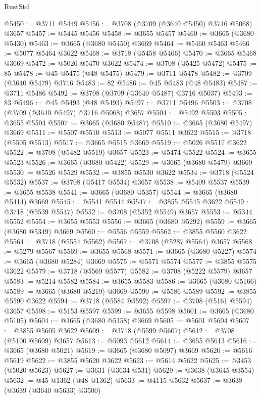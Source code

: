 \begin{lexlean}{RustStd}
\begin{coremodule}
@5450 := @3711 @5449
@5456 := @3708 (@3709 (@3640 @5450) @3716 @5068) @3657
@5457 := @5445 @5456
@5458 := @3655 @5457
@5460 := @3665 (@3680 @5430)
@5463 := @3665 (@3680 @5450) @3669
@5464 := @5460 @5463
@5466 := @5077 @5464 @3622
@5468 := @3718 (@5458 @5466)
@5470 := @3665 @5468 @3669
@5472 := @5026 @5470 @3622
@5474 := @3708 (@5425 @5472)
@5475 := 85
@5478 := @45 @5475 (@48 @5475)
@5479 := @3711 @5478
@5482 := @3709 (@3640 @5479) @3716
@5483 := 82
@5486 := @45 @5483 (@48 @5483)
@5487 := @3711 @5486
@5492 := @3708 (@3709 (@3640 @5487) @3716 @5037)
@5493 := 83
@5496 := @45 @5493 (@48 @5493)
@5497 := @3711 @5496
@5503 := @3708 (@3709 (@3640 @5497) @3716 @5068) @3657
@5504 := @5492 @5503
@5505 := @3655 @5504
@5507 := @3665 (@3680 @5487)
@5510 := @3665 (@3680 @5497) @3669
@5511 := @5507 @5510
@5513 := @5077 @5511 @3622
@5515 := @3718 (@5505 @5513)
@5517 := @3665 @5515 @3669
@5519 := @5026 @5517 @3622
@5522 := @3708 (@5482 @5519) @3657
@5523 := @5474 @5522
@5524 := @3655 @5523
@5526 := @3665 (@3680 @5422)
@5529 := @3665 (@3680 @5479) @3669
@5530 := @5526 @5529
@5532 := @3855 @5530 @3622
@5534 := @3718 (@5524 @5532)
@5537 := @3708 (@5417 @5534) @3657
@5538 := @5409 @5537
@5539 := @3655 @5538
@5541 := @3665 (@3680 @5357)
@5544 := @3665 (@3680 @5414) @3669
@5545 := @5541 @5544
@5547 := @3855 @5545 @3622
@5549 := @3718 (@5539 @5547)
@5552 := @3708 (@5352 @5549) @3657
@5553 := @5344 @5552
@5554 := @3655 @5553
@5556 := @3665 (@3680 @5292)
@5559 := @3665 (@3680 @5349) @3669
@5560 := @5556 @5559
@5562 := @3855 @5560 @3622
@5564 := @3718 (@5554 @5562)
@5567 := @3708 (@5287 @5564) @3657
@5568 := @5279 @5567
@5569 := @3655 @5568
@5571 := @3665 (@3680 @5227)
@5574 := @3665 (@3680 @5284) @3669
@5575 := @5571 @5574
@5577 := @3855 @5575 @3622
@5579 := @3718 (@5569 @5577)
@5582 := @3708 (@5222 @5579) @3657
@5583 := @5214 @5582
@5584 := @3655 @5583
@5586 := @3665 (@3680 @5166)
@5589 := @3665 (@3680 @5219) @3669
@5590 := @5586 @5589
@5592 := @3855 @5590 @3622
@5594 := @3718 (@5584 @5592)
@5597 := @3708 (@5161 @5594) @3657
@5598 := @5153 @5597
@5599 := @3655 @5598
@5601 := @3665 (@3680 @5105)
@5604 := @3665 (@3680 @5158) @3669
@5605 := @5601 @5604
@5607 := @3855 @5605 @3622
@5609 := @3718 (@5599 @5607)
@5612 := @3708 (@5100 @5609) @3657
@5613 := @5093 @5612
@5614 := @3655 @5613
@5616 := @3665 (@3680 @5021)
@5619 := @3665 (@3680 @5097) @3669
@5620 := @5616 @5619
@5622 := @3855 @5620 @3622
@5623 := @5614 @5622
@5625 := @3453 (@5020 @5623)
@5627 := @3631 (@3634 @531)
@5629 := @3638 (@3645 @3554)
@5632 := @45 @1362 (@48 @1362)
@5633 := @4115 @5632
@5637 := @3638 (@3639 (@3640 @5633) @3500)

\end{coremodule}
\end{lexlean}
